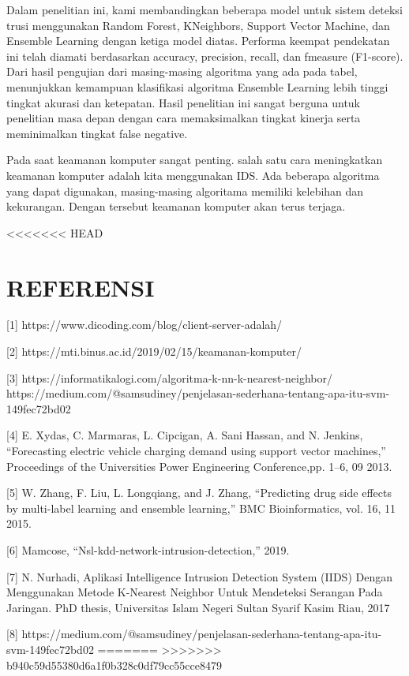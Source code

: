 \documentclass[conference]{IEEEtran}
\begin{document}
Dalam penelitian ini, kami membandingkan beberapa model
untuk sistem deteksi trusi menggunakan Random Forest, KNeighbors, Support Vector Machine, dan Ensemble Learning
dengan ketiga model diatas. Performa keempat pendekatan ini
telah diamati berdasarkan accuracy, precision, recall, dan fmeasure (F1-score).
Dari hasil pengujian dari masing-masing algoritma yang
ada pada tabel, menunjukkan kemampuan klasifikasi algoritma
Ensemble Learning lebih tinggi tingkat akurasi dan ketepatan.
Hasil penelitian ini sangat berguna untuk penelitian masa
depan dengan cara memaksimalkan tingkat kinerja serta meminimalkan tingkat false negative.

Pada saat keamanan komputer sangat penting. salah satu
cara meningkatkan keamanan komputer adalah kita menggunakan IDS. Ada beberapa algoritma yang dapat digunakan,
masing-masing algoritama memiliki kelebihan dan kekurangan. Dengan tersebut keamanan komputer akan terus terjaga.




<<<<<<< HEAD
\section{REFERENSI}

[1] https://www.dicoding.com/blog/client-server-adalah/

[2] https://mti.binus.ac.id/2019/02/15/keamanan-komputer/

[3] https://informatikalogi.com/algoritma-k-nn-k-nearest-neighbor/
https://medium.com/@samsudiney/penjelasan-sederhana-tentang-apa-itu-svm-149fec72bd02

[4] E. Xydas, C. Marmaras, L. Cipcigan, A. Sani Hassan, and N. Jenkins,
“Forecasting electric vehicle charging demand using support vector machines,” Proceedings of the Universities Power Engineering Conference,pp. 1–6, 09 2013.

[5] W. Zhang, F. Liu, L. Longqiang, and J. Zhang, “Predicting drug side
effects by multi-label learning and ensemble learning,” BMC Bioinformatics, vol. 16, 11 2015.

[6] Mamcose, “Nsl-kdd-network-intrusion-detection,” 2019.

[7] N. Nurhadi, Aplikasi Intelligence Intrusion Detection System (IIDS)
Dengan Menggunakan Metode K-Nearest Neighbor Untuk Mendeteksi
Serangan Pada Jaringan. PhD thesis, Universitas Islam Negeri Sultan
Syarif Kasim Riau, 2017

[8] https://medium.com/@samsudiney/penjelasan-sederhana-tentang-apa-itu-svm-149fec72bd02
=======
>>>>>>> b940c59d55380d6a1f0b328c0df79cc55cce8479
\end{document}
